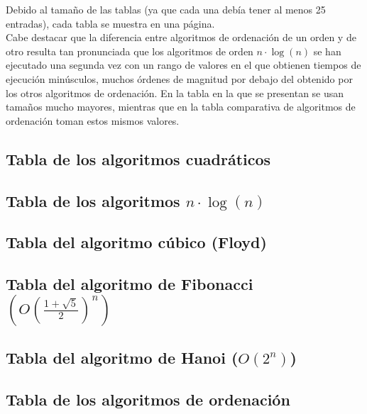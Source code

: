 \documentclass[a4paper, 11pt]{article}
\begin{document}
Debido al tamaño de las tablas (ya que cada una debía tener al menos 25 entradas),
cada tabla se muestra en una página. \\

Cabe destacar que la diferencia entre algoritmos de ordenación de un orden y de
otro resulta tan pronunciada que los algoritmos de orden $n \cdot \log (n)$ se
han ejecutado una segunda vez con un rango de valores en el que obtienen tiempos
de ejecución minúsculos, muchos órdenes de magnitud por debajo del obtenido por
los otros algoritmos de ordenación. En la tabla en la que se presentan se usan
tamaños mucho mayores, mientras que en la tabla comparativa de algoritmos de
ordenación toman estos mismos valores.

\subsection{Tabla de los algoritmos cuadráticos}


\subsection{Tabla de los algoritmos $n\cdot \log(n)$ }


\subsection{Tabla del algoritmo cúbico (Floyd)}


\subsection{Tabla del algoritmo de Fibonacci $(O(\frac{1+\sqrt{5}}{2})^n)$}


\subsection{Tabla del algoritmo de Hanoi ($O(2^n)$)}


\subsection{Tabla de los algoritmos de ordenación}
\end{document}
